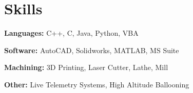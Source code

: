 \section{Skills}
    \begin{onecolentry}
        \textbf{Languages:} C++, C, Java, Python, VBA
    \end{onecolentry}

    \vspace{0.2 cm}

    \begin{onecolentry}
        \textbf{Software:} AutoCAD, Solidworks, MATLAB, MS Suite
    \end{onecolentry}

    \vspace{0.2 cm}

    \begin{onecolentry}
        \textbf{Machining:} 3D Printing, Laser Cutter, Lathe, Mill
    \end{onecolentry}

    \vspace{0.2 cm}

    \begin{onecolentry}
        \textbf{Other:} Live Telemetry Systems, High Altitude Ballooning
    \end{onecolentry}
